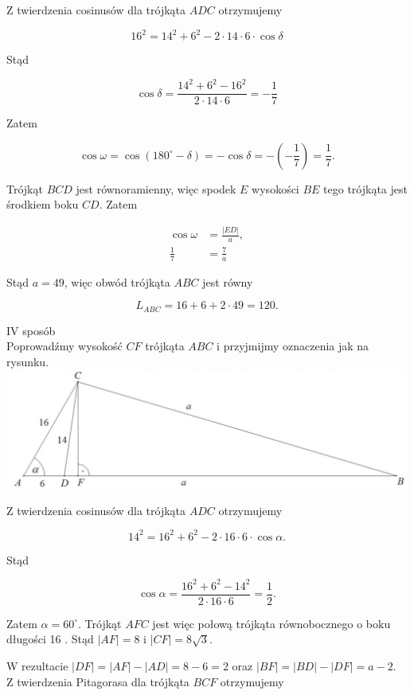 \documentclass[10pt]{article}
\begin{document}
Z twierdzenia cosinusów dla trójkąta $A D C$ otrzymujemy

$$
16^{2}=14^{2}+6^{2}-2 \cdot 14 \cdot 6 \cdot \cos \delta
$$

Stąd

$$
\cos \delta=\frac{14^{2}+6^{2}-16^{2}}{2 \cdot 14 \cdot 6}=-\frac{1}{7}
$$

Zatem

$$
\cos \omega=\cos \left(180^{\circ}-\delta\right)=-\cos \delta=-\left(-\frac{1}{7}\right)=\frac{1}{7} .
$$

Trójkąt $B C D$ jest równoramienny, więc spodek $E$ wysokości $B E$ tego trójkąta jest środkiem boku $C D$. Zatem

$$
\begin{aligned}
\cos \omega & =\frac{|E D|}{a}, \\
\frac{1}{7} & =\frac{7}{a}
\end{aligned}
$$

Stąd $a=49$, więc obwód trójkąta $A B C$ jest równy

$$
L_{A B C}=16+6+2 \cdot 49=120 .
$$

IV sposób\\
Poprowadźmy wysokość $C F$ trójkąta $A B C$ i przyjmijmy oznaczenia jak na rysunku.\\
\includegraphics[max width=\textwidth, center]{2025_02_07_d712b9a47aa2c64928dbg-26}

Z twierdzenia cosinusów dla trójkąta $A D C$ otrzymujemy

$$
14^{2}=16^{2}+6^{2}-2 \cdot 16 \cdot 6 \cdot \cos \alpha .
$$

Stąd

$$
\cos \alpha=\frac{16^{2}+6^{2}-14^{2}}{2 \cdot 16 \cdot 6}=\frac{1}{2} .
$$

Zatem $\alpha=60^{\circ}$. Trójkąt $A F C$ jest więc połową trójkąta równobocznego o boku długości 16 . Stąd $|A F|=8$ i $|C F|=8 \sqrt{3}$.

W rezultacie $|D F|=|A F|-|A D|=8-6=2$ oraz $|B F|=|B D|-|D F|=a-2$.\\
Z twierdzenia Pitagorasa dla trójkąta $B C F$ otrzymujemy
\end{document}

